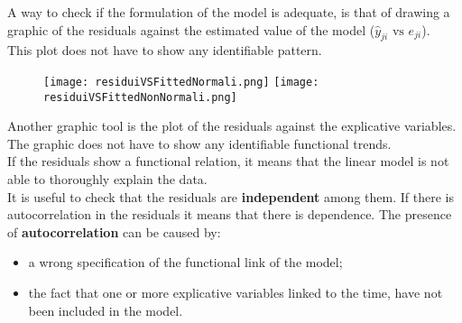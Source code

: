 \begin{frame}
  A way to check if the formulation of the model is adequate, is that of drawing a graphic of the residuals against the estimated value of the model ($ \hat{y}_{ji} \mbox{ vs } e_{ji} $). \\
  \vspace{.25cm}
  This plot does not have to show any identifiable pattern.\\
  \vspace{.25cm}
  \begin{figure}[htbp]
    \centering
    \texttt{[image: residuiVSFittedNormali.png]}%
    \qquad\qquad
    \texttt{[image: residuiVSFittedNonNormali.png]}
  \end{figure}
\end{frame}

\begin{frame}
  Another graphic tool is the plot of the residuals against the explicative variables. The graphic does not have to show any identifiable functional trends.\\
  \vspace{0.2cm}
  If the residuals show a functional relation, it means that the linear model is not able to thoroughly explain the data.\\
  \vspace{0.75cm}
  It is useful to check that the residuals are \textbf{independent} among them. If there is autocorrelation in the residuals it means that there is dependence.
  The presence of \textbf{autocorrelation} can be caused by:
  \begin{itemize}
    \item a wrong specification of the functional link of the model;
    \item the fact that one or more explicative variables linked to the time, have not been included in the model.
  \end{itemize}
\end{frame}


